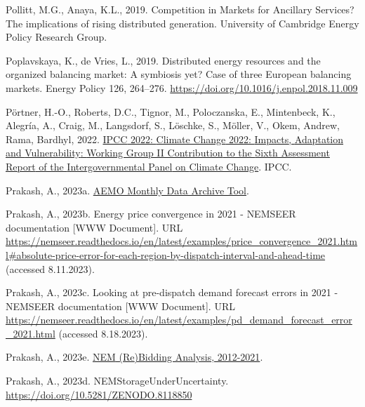 \documentclass[12pt,a4paper,]{report}
\newlength{\cslhangindent}
\newenvironment{CSLReferences}[2] %
 {%
  \setlength{\parindent}{0pt}
  \ifodd #1 \everypar{\setlength{\hangindent}{\cslhangindent}}\ignorespaces\fi
  \ifnum #2 > 0
  \setlength{\parskip}{#2\baselineskip}
  \fi
 }%
 {}
\begin{document}
\begin{CSLReferences}{1}{0}
\leavevmode{}%
Pollitt, M.G., Anaya, K.L., 2019. Competition in {Markets} for
{Ancillary Services}? {The} implications of rising distributed
generation. University of Cambridge Energy Policy Research Group.

\leavevmode{}%
Poplavskaya, K., de Vries, L., 2019. Distributed energy resources and
the organized balancing market: {A} symbiosis yet? {Case} of three
{European} balancing markets. Energy Policy 126, 264--276.
\url{https://doi.org/10.1016/j.enpol.2018.11.009}

\leavevmode{}%
Pörtner, H.-O., Roberts, D.C., Tignor, M., Poloczanska, E., Mintenbeck,
K., Alegría, A., Craig, M., Langsdorf, S., Löschke, S., Möller, V.,
Okem, Andrew, Rama, Bardhyl, 2022.
\href{https://report.ipcc.ch/ar6/wg2/IPCC_AR6_WGII_FullReport.pdf}{{IPCC}
2022: {Climate Change} 2022: {Impacts}, {Adaptation} and
{Vulnerability}: {Working Group II Contribution} to the {Sixth
Assessment Report} of the {Intergovernmental Panel} on {Climate
Change}}. IPCC.

\leavevmode{}%
Prakash, A., 2023a.
\href{https://github.com/prakaa/mms-monthly-cli}{{AEMO Monthly Data
Archive Tool}}.

\leavevmode{}%
Prakash, A., 2023b. Energy price convergence in 2021 - {NEMSEER}
documentation {[}WWW Document{]}. URL
\url{https://nemseer.readthedocs.io/en/latest/examples/price_convergence_2021.html\#absolute-price-error-for-each-region-by-dispatch-interval-and-ahead-time}
(accessed 8.11.2023).

\leavevmode{}%
Prakash, A., 2023c. Looking at pre-dispatch demand forecast errors in
2021 - {NEMSEER} documentation {[}WWW Document{]}. URL
\url{https://nemseer.readthedocs.io/en/latest/examples/pd_demand_forecast_error_2021.html}
(accessed 8.18.2023).

\leavevmode{}%
Prakash, A., 2023e.
\href{https://github.com/prakaa/nem-rebidding-analysis-2012-2021}{{NEM}
({Re}){Bidding Analysis}, 2012-2021}.

\leavevmode{}%
Prakash, A., 2023d. {NEMStorageUnderUncertainty}.
\url{https://doi.org/10.5281/ZENODO.8118850}


\end{CSLReferences}
\end{document}
